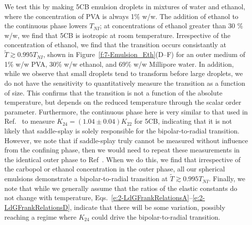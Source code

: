 We test this by making 5CB emulsion droplets in mixtures of water and ethanol, where the concentration of PVA is always 1\% w/w.
The addition of ethanol to the continuous phase lowers $T_{NI}$; at concentrations of ethanol greater than 30 \% w/w, we find that 5CB is isotropic at room temperature.
Irrespective of the concentration of ethanol, we find that the transition occurs consistantly at $\tilde{T} \gtrsim 0.995 T_{NI}$, shown in Figure~\ref{f:7-Emulsion_Eth}(D--F) for an outer medium of 1\% w/w PVA, 30\% w/w ethanol, and 69\% w/w Millipore water.
In addition, while we observe that small droplets tend to transform before large droplets, we do not have the sensitivity to quantitatively measure the transition as a function of size.
This confirms that the transition is not a function of the absolute temperature, but depends on the reduced temperature through the scalar order parameter.
Furthermore, the continuous phase here is very similar to that used in Ref.~\cite{RN24} to measure $K_{24} =(1.04 \pm 0.04)K_{22}$ for 5CB, indicating that it is not likely that saddle-splay is solely responsible for the bipolar-to-radial transition.
However, we note that if saddle-splay truly cannot be measured without influence from the confining phase, then we would need to repeat these measurements in the identical outer phase to Ref~\cite{RN24}.
When we do this, we find that irrespective of the carbopol or ethanol concentration in the outer phase, all our spherical emulsions demonstrate a bipolar-to-radial transition at $\tilde{T}\gtrsim 0.995 T_{NI}$.
Finally, we note that while we generally assume that the ratios of the elastic constants do not change with temperature, Eqs.~\ref{e:2-LdGFrankRelationsA}--\ref{e:2-LdGFrankRelationsD}, indicate that there will be some variation, possibly reaching a regime where $K_{24}$ could drive the bipolar-to-radial transition.
